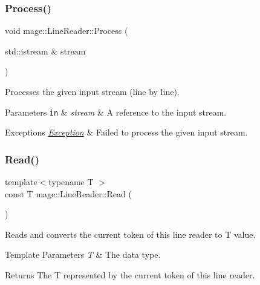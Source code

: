 \subsubsection{\texorpdfstring{Process()}{Process()}}
{\footnotesize\ttfamily void mage\+::\+Line\+Reader\+::\+Process (\begin{DoxyParamCaption}\item[{std\+::istream \&}]{stream }\end{DoxyParamCaption})\hspace{0.3cm}{\ttfamily [private]}}

Processes the given input stream (line by line).


\begin{DoxyParams}[1]{Parameters}
\mbox{\tt in}  & {\em stream} & A reference to the input stream. \\
\hline
\end{DoxyParams}

\begin{DoxyExceptions}{Exceptions}
{\em \mbox{\hyperlink{classmage_1_1_exception}{Exception}}} & Failed to process the given input stream. \\
\hline
\end{DoxyExceptions}
\mbox{\label{classmage_1_1_line_reader_a9bbad433ab93ce012aec7155adafbedb}} 
\subsubsection{\texorpdfstring{Read()}{Read()}\hspace{0.1cm}{\footnotesize\ttfamily [1/2]}}
{\footnotesize\ttfamily template$<$typename T $>$ \\
const T mage\+::\+Line\+Reader\+::\+Read (\begin{DoxyParamCaption}{ }\end{DoxyParamCaption})\hspace{0.3cm}{\ttfamily [protected]}}

Reads and converts the current token of this line reader to {\ttfamily T} value.


\begin{DoxyTemplParams}{Template Parameters}
{\em T} & The data type. \\
\hline
\end{DoxyTemplParams}
\begin{DoxyReturn}{Returns}
The {\ttfamily T} represented by the current token of this line reader. 
\end{DoxyReturn}

